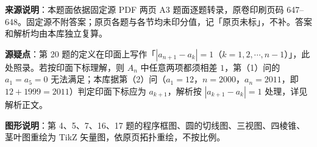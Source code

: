 


\begin{gktip}
\textbf{来源说明}：本题面依据固定源 PDF 两页 A3 题面逐题转录，原卷印刷页码 647–648。固定源不附答案；原页各题与各节均未印分值，记「原页未标」，不补。答案和解析均由本库独立复算。

\textbf{源疑点}：第 20 题的定义在印面上写作「$|a_{n+1}-a_k|=1$（$k=1,2,\cdots,n-1$）」，此处照录。若按印面下标理解，则 $A_n$ 中任意两项都须相差 $1$，第（1）问的 $a_1=a_5=0$ 无法满足；本库据第（2）问（$a_1=12$，$n=2000$，$a_n=2011$，即 $12+1999=2011$）判定印面下标应为 $a_{k+1}$，解析按 $|a_{k+1}-a_k|=1$ 处理，详见解析正文。

\textbf{图形说明}：第 4、5、7、16、17 题的程序框图、圆的切线图、三视图、四棱锥、茎叶图重绘为 TikZ 矢量图，依原页拓扑重绘，不按比例。
\end{gktip}


